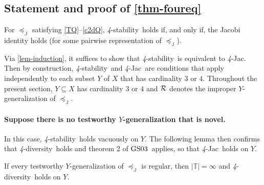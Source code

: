 \documentclass[12pt,a4paper,twoside]{article}
\makeatletter
\newcommand{\srcsize}{\@setfontsize{\srcsize}{3pt}{3pt}}
\newcommand{\gsii}{$\textup{GS03}$}
\newcommand\mplus{\text{\srcsize$+$}}
\newcommand{\ext}{\mathrel{\mc R}}
\newcommand{\mbbc}{{\mathds C}}
\newcommand{\mbbt}{{\mathds {T}}}
\newcommand{\mbbj}{\mathds J}
\newcommand{\stability}{\textit{4}-\textup{{stability}}}
\newcommand{\fourdiv}{\textit{4}-\textup{diversity}}
\newcommand{\fourjac}{\textup{\textit{4}-Jac}}
\makeatother
\begin{document}
\begin{appendices}
\section{Statement and proof of \cref{thm-foureq}}\label{sec-proof-foureq}
 \begin{theorem}\label{thm-foureq}
   For $\preceq_{\mbbj}$ satisfying \ref{TQ}--\ref{c2dQ}, \stability\ holds if,
   and only if, the Jacobi identity holds (for some pairwise representation of
   $\preceq_{\mbbj}$).
 \end{theorem}
 Via \cref{lem-induction}, it suffices to show that \stability\ is equivalent
 to \fourjac. Then by construction, \stability\ and \fourjac\ are conditions
 that apply independently to each subset $Y$ of $X$ that has cardinality $3$ or
 $4$.  Throughout the present section, $Y\subseteq X$ has cardinality $3$ or
 $4$ and $\ext$ denotes the improper $Y$-{generalization} of $\preceq_{\mbbj}$.
  \paragraph{Suppose there is no testworthy $Y$-{generalization} that is
 novel.}\hskip-7pt In this case, \stability\ holds vacuously on $Y$. The
 following lemma then confirms that \fourdiv\ holds and theorem 2 of \gsii\
 applies, so that \fourjac\ holds on $Y$.
\begin{lemma}\label{lem-test-empty-fourdiv}
  If every testworthy $Y$-{generalization} of $\preceq_{\mbbj}$ is regular,
  then $\lvert \mbbt \rvert = \infty$ and \fourdiv\ holds on $Y$.
\end{lemma}


\end{appendices}
\end{document}
